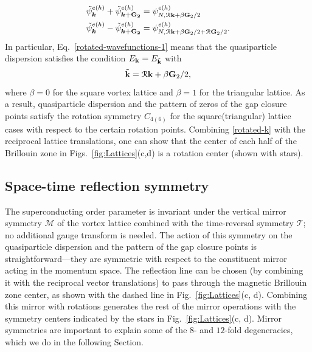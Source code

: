 \documentclass[10pt,prb,aps,superscriptaddress,amsmath,amssymb,twocolumn,floatfix,longbibliography]{revtex4-1}
\newcommand{\be}{\begin{equation} }
\newcommand{\ee}{\end{equation}}
\newcommand{\bk}{{\bf k}}
\newcommand{\bG}{{\bf G}}
\newcommand{\R}{\mathcal{R}}
\begin{document}
\begin{subequations}
\label{rotated-wavefunctions}
\begin{align}
    \label{rotated-wavefunctions-1}
    \tilde{\psi}_{\bm{\bm{k}}}^{e(h)} + \tilde{\psi}_{\bm{\bm{k}+\bG_2}}^{e(h)} & = \psi_{N, \R\bk + \beta \bG_2 / 2}^{e(h)}\\
    \tilde{\psi}_{\bm{\bm{k}}}^{e(h)} - \tilde{\psi}_{\bm{\bm{k}+\bG_2}}^{e(h)} & =\psi_{N, \R\bk + \beta \bG_2 / 2 + \R \bG_2/2}^{e(h)} .
\end{align}
\end{subequations}
In particular, Eq.~\eqref{rotated-wavefunctions-1} means that the quasiparticle dispersion satisfies the condition $E_{\bk} = E_{\tilde{\bk}}$ with
\be \label{rotated-k}
    \tilde{\bk} = \R\bk + \beta \bG_2 / 2,
\ee
where $\beta = 0$ for the square vortex lattice and $\beta = 1$ for the triangular lattice. As a result, quasiparticle dispersion and the pattern of zeros of the gap closure points satisfy the rotation symmetry $C_{4(6)}$ for the square(triangular) lattice cases with respect to the certain rotation points. Combining \eqref{rotated-k} with the reciprocal lattice translations, one can show that the center of each half of the Brillouin zone in Figs.~\ref{fig:Lattices}(c,d) is a rotation center (shown with stars).

\subsection{Space-time reflection symmetry}

The superconducting order parameter is invariant under the vertical mirror symmetry $\mathcal{M}$ of the vortex lattice combined with the time-reversal symmetry $\mathcal{T}$; no additional gauge transform is needed. 
The action of this symmetry on the quasiparticle dispersion and the pattern of the gap closure points is straightforward---they are symmetric with respect to the constituent mirror acting in the momentum space. The reflection line can be chosen (by combining it with the reciprocal vector translations) to pass through the magnetic Brillouin zone center, as shown with the dashed line  in Fig.~\ref{fig:Lattices}(c, d). Combining this mirror with rotations generates the rest of the mirror operations with the symmetry centers indicated by the stars in Fig.~\ref{fig:Lattices}(c, d). Mirror symmetries are important to explain some of the $8$- and $12$-fold degeneracies, which we do in the following Section. 
\end{document}
